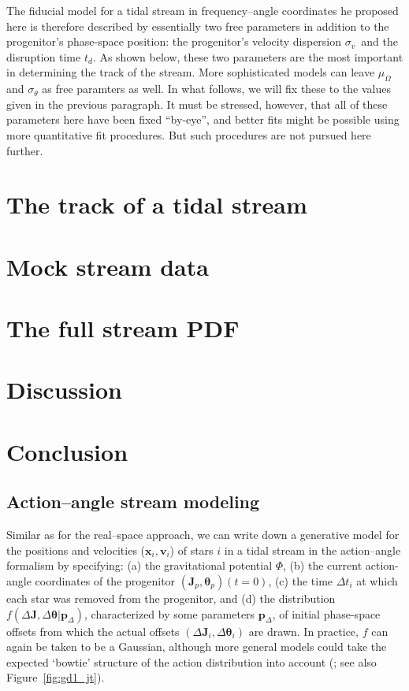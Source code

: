 \documentclass[12pt,preprint]{aastex}
\renewcommand{\figurename}{Figure}
\renewcommand{\vec}[1]{\ensuremath{\mathbf{#1}}}
\newcommand{\vecx}{\ensuremath{\vec{x}}}
\newcommand{\vecv}{\ensuremath{\vec{v}}}
\newcommand{\vecj}{\ensuremath{\vec{J}}}
\newcommand{\veca}{\ensuremath{\boldsymbol\theta}}
\newcommand{\paramsdiff}{\ensuremath{\vec{p}_\Delta}}
\newcommand{\sigv}{\ensuremath{\sigma_v}}
\begin{document}
The fiducial model for a tidal stream in frequency--angle coordinates
he proposed here is therefore described by essentially two free
parameters in addition to the progenitor's phase-space position: the
progenitor's velocity dispersion \sigv\ and the disruption time
$t_d$. As shown below, these two parameters are the most important in
determining the track of the stream. More sophisticated models can
leave $\mu_\Omega$ and $\sigma_{\theta}$ as free paramters as well. In
what follows, we will fix these to the values given in the previous
paragraph. It must be stressed, however, that all of these parameters
here have been fixed ``by-eye'', and better fits might be possible
using more quantitative fit procedures. But such procedures are not
pursued here further.

\section{The track of a tidal stream}\label{sec:track}



\section{Mock stream data}\label{sec:mock}

\section{The full stream PDF}\label{sec:pdf}

\section{Discussion}\label{sec:discussion}

\section{Conclusion}\label{sec:conclusion}



\subsection{Action--angle stream modeling}

Similar as for the real--space approach, we can write down a
generative model for the positions and velocities ($\vecx_i,\vecv_i$)
of stars $i$ in a tidal stream in the action--angle formalism by
specifying: (a) the gravitational potential $\Phi$, (b) the current
action-angle coordinates of the progenitor $(\vecj_p,\veca_p)(t=0)$,
(c) the time $\Delta t_i$ at which each star was removed from the
progenitor, and (d) the distribution $f(\Delta \vecj,\Delta
\veca|\paramsdiff)$, characterized by some parameters $\paramsdiff$,
of initial phase-space offsets from which the actual offsets $(\Delta
\vecj_i,\Delta \veca_i)$ are drawn. In practice, $f$ can again be
taken to be a Gaussian, although more general models could take the
expected `bowtie' structure of the action distribution into account
(\citealt{Eyre11a}; see also \figurename~\ref{fig:gd1_jt}).
\end{document}

